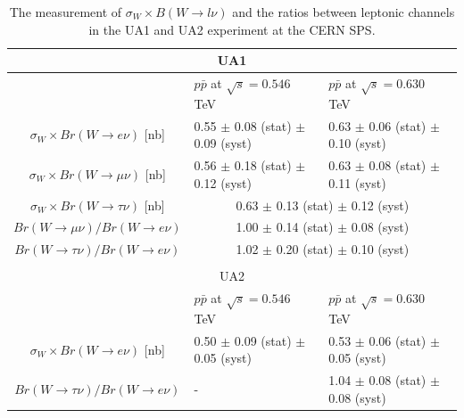 \begin{table}[ht]
    \setlength{\tabcolsep}{ 0.5 em}
    \renewcommand{\arraystretch}{1.2}
    \centering
    \begin{tabular}{ |c|l l| } 
         
         \hline
         \multicolumn{3}{|c|}{UA1 \cite{Albajar:1988ka} }  \\
         \hline
         & $p\bar{p}$ at $\sqrt{s}=0.546$ TeV &  $p\bar{p}$ at $\sqrt{s}=0.630$ TeV \\
         \hline
         $\sigma_W \times Br(W\to e    \nu)$  [nb]  & 0.55 $\pm$ 0.08 (stat) $\pm$ 0.09 (syst) & 0.63 $\pm$ 0.06 (stat) $\pm$ 0.10 (syst) \\ 
         $\sigma_W \times Br(W\to \mu  \nu)$  [nb]  & 0.56 $\pm$ 0.18 (stat) $\pm$ 0.12 (syst) & 0.63 $\pm$ 0.08 (stat) $\pm$ 0.11 (syst) \\ 
         $\sigma_W \times Br(W\to \tau \nu)$  [nb]  & \multicolumn{2}{c|}{ 0.63 $\pm$ 0.13 (stat) $\pm$ 0.12 (syst) }  \\ 
         \hline
         $Br(W\to \mu  \nu)/ Br(W\to e \nu)$  & \multicolumn{2}{c|}{1.00  $\pm$ 0.14 (stat) $\pm$ 0.08 (syst) } \\
         $Br(W\to \tau \nu)/ Br(W\to e \nu)$  & \multicolumn{2}{c|}{1.02  $\pm$ 0.20 (stat) $\pm$ 0.10 (syst) } \\
         
         \hline
         \multicolumn{2}{c}{} \\
         
         \hline
         \multicolumn{3}{|c|}{UA2}  \\
         \hline
         & $p\bar{p}$ at $\sqrt{s}=0.546$ TeV &  $p\bar{p}$ at $\sqrt{s}=0.630$ TeV \\
         \hline
         $\sigma_W \times Br(W\to e    \nu)$  [nb] \cite{appel1986measurement} & 0.50 $\pm$ 0.09 (stat) $\pm$ 0.05 (syst) & 0.53 $\pm$ 0.06 (stat) $\pm$ 0.05 (syst) \\ 
         \hline
         $Br(W\to \tau \nu)/ Br(W\to e \nu)$ \cite{Alitti:1992hv} & - & 1.04  $\pm$ 0.08 (stat) $\pm$ 0.08 (syst) \\
         
         \hline
    \end{tabular}
    
    \caption{The measurement of $\sigma_W \times B(W\to l \nu)$ and the ratios between leptonic channels in the UA1 and UA2 experiment at the CERN SPS. }
    \label{tab:relatedWorks:lu:W:sps}
\end{table}





